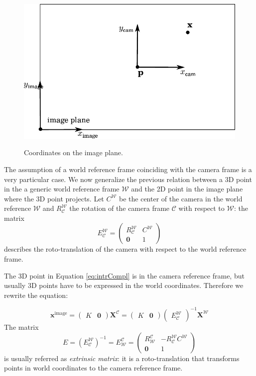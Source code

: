 \begin{figure}[t]
\centering
  \includegraphics[width=0.8\columnwidth]{./img/ch-camera/camera02}\\
 \caption{Coordinates on the image plane.}
 \label{fig:centercamera}
\end{figure}
The assumption of a world reference frame coinciding with the camera frame is a very particular case. We now generalize the previous relation between a 3D point in the a generic world reference frame $\mathcal{W}$ and the 2D point in the image plane where the 3D point projects.
Let $C^\mathcal{W}$ be the center of the camera in the world reference $\mathcal{W}$ and  $R_\mathcal{C}^\mathcal{W}$ the rotation of the camera frame $\mathcal{C}$ with respect to $\mathcal{W}$: the matrix 
\begin{equation}
E_\mathcal{C}^\mathcal{W} = 
\begin{pmatrix}
R_\mathcal{C}^\mathcal{W} &C^\mathcal{W}\\
\mathbf{0}&1
 \end{pmatrix}   
\end{equation}
 describes the roto-translation of the camera with respect to the world reference frame.

The 3D point in Equation \ref{eq:intrCompl} is in the camera reference frame, but usually 3D points have to be expressed in the world coordinates. Therefore we rewrite the equation:


\begin{equation}
 \mathbf{x}^{\text{image}} =
\begin{pmatrix}
 K &\mathbf{0}
 \end{pmatrix} 
 \mathbf{X}^\mathcal{C}
 = 
\begin{pmatrix}
 K &\mathbf{0}
 \end{pmatrix} 
\begin{pmatrix}
 E_\mathcal{C}^\mathcal{W}
 \end{pmatrix}^{-1}
 \mathbf{X}^\mathcal{W}
\end{equation}
The matrix 
\begin{equation}
  E = (E_\mathcal{C}^\mathcal{W})^{-1} = E_{\mathcal{W}}^{\mathcal{C}} = 
\begin{pmatrix}
R_\mathcal{W}^\mathcal{C} & - R_\mathcal{C}^\mathcal{W} C^\mathcal{W}\\
\mathbf{0}&1
 \end{pmatrix}
\end{equation}
is usually referred as \emph{extrinsic matrix}: it is a roto-translation that transforms points in world coordinates to the camera reference frame.

